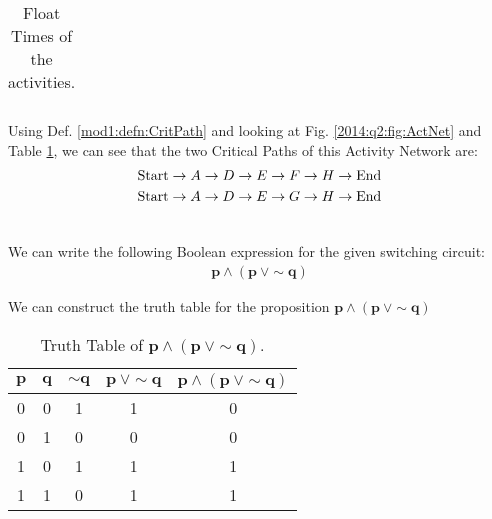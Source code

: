 \begin{subquestions}
\begin{subsubquestions}
\begin{table}[H]
\begin{tabular}{|c|c|c|c|}
	\end{tabular}
\caption{\label{2014:tab:Act} Float Times of the activities.}
\end{table}


\subsubquestion

Using Def. \ref{mod1:defn:CritPath} and looking at Fig. \ref{2014:q2:fig:ActNet} and Table \ref{2014:tab:Act}, we can see that the two Critical Paths of this Activity Network are:
\begin{align}
	\text{Start} \rightarrow A \rightarrow D \rightarrow E \rightarrow F \rightarrow H \rightarrow \text{End} \nonumber \\
	\text{Start} \rightarrow A \rightarrow D \rightarrow E \rightarrow G \rightarrow H \rightarrow \text{End} \nonumber \\ \nonumber
\end{align}
	
\end{subsubquestions}


\subquestion

\begin{subsubquestions}
	
\subsubquestion

We can write the following Boolean expression for the given switching circuit:
\begin{align}
	\boldsymbol{p \wedge (p \: \vee \sim q)} \label{2014:q2:eqn:Bool}
\end{align}


\subsubquestion

We can construct the truth table for the proposition $\boldsymbol{p \land (p ~\lor \sim q)}$
\begin{table}[ht]
	\centering
	\begin{tabular}{|c|c|c|c|c|}
		\hline
		$\boldsymbol{p}$ &$\boldsymbol{q}$ & $\boldsymbol{\sim q}$ & $\boldsymbol{p \ \vee \sim q}$ & $\boldsymbol{p \wedge ( p \ \vee \sim q)}$ \\
		\hline
		0 & 0 & 1 & 1 & 0 \\
		0 & 1 & 0 & 0 & 0 \\
		1 & 0 & 1 & 1 & 1 \\
		1 & 1 & 0 & 1 & 1 \\
		\hline
	\end{tabular}
	\caption{\label{2014:tab:TrthTab}Truth Table of $\boldsymbol{p \land (p ~\lor \sim q)}$.}
\end{table}


\end{subsubquestions}
\end{subquestions}
